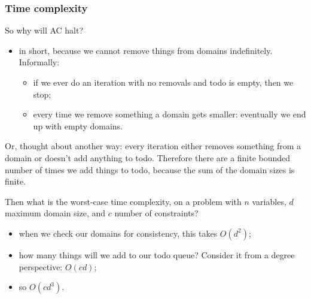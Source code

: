\documentclass[11pt]{article}
\begin{document}
\subsubsection{Time complexity}

So why will AC halt?
\begin{itemize}
    \item in short, because we cannot remove things from domains indefinitely. Informally:
    \begin{itemize}
        \item if we ever do an iteration with no removals and todo is empty, then we stop;
        \item every time we remove something a domain gets smaller: eventually we end up with empty domains.
    \end{itemize}
\end{itemize}

Or, thought about another way: every iteration either removes something from a domain or doesn't add anything to todo. Therefore there are a finite bounded number of times we add things to todo, because the sum of the domain sizes is finite.

Then what is the worst-case time complexity, on a problem with $n$ variables, $d$ maximum domain size, and $c$ number of constraints?
\begin{itemize}
    \item when we check our domains for consistency, this takes $O(d^2)$;
    \item how many things will we add to our todo queue? Consider it from a degree perspective: $O(cd)$;
    \item so $O(cd^3)$.
\end{itemize}
\end{document}
